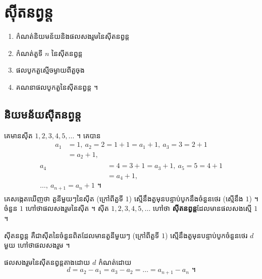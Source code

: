 \chapter{ស៊ីតនព្វន្ត}

\begin{objBox}[វត្ថុបំណង]
\begin{enumerate}[1]
  \item កំណត់និយមន័យនិងផលសងរួមនៃស៊ីតនព្វន្ត
  \item កំណត់តួទី $n$ នៃស៊ីតនព្វន្ត
  \item ផលបូកតួស្មើចម្ងាយពីតួចុង
  \item គណនាផលបូកតួនៃស៊ីតនព្វន្ត ។
\end{enumerate}
\end{objBox}

\section{និយមន័យស៊ីតនព្វន្ត}

\begin{example}[ឧទាហរណ៍]
គេមានស៊ីត $1, 2, 3, 4, 5, \ldots$ ។ គេបាន
\[
\begin{aligned}
a_1 &= 1,\ a_2 = 2 = 1 + 1 = a_1 + 1,\ a_3 = 3 = 2 + 1\\
&= a_2 + 1,
\end{aligned}
\]
\[
\begin{gathered}
\begin{aligned}
a_4 &= 4 = 3 + 1 = a_3 + 1,\ a_5 = 5 = 4 + 1\\
&= a_4 + 1,\\ \ldots,\ a_{n+1} = a_n + 1 \text{ ។}
\end{aligned}
\end{gathered}
\]
គេសង្កេតឃើញថា តួនីមួយៗនៃស៊ីត (ក្រៅពីតួទី $1$) ស្មើនឹងតួមុនបន្ទាប់បូកនឹងចំនួនថេរ (ស្មើនឹង $1$) ។ ចំនួន $1$ ហៅថាផលសងរួមនៃស៊ីត ។ ស៊ីត $1, 2, 3, 4, 5, \ldots$ ហៅថា \textbf{ស៊ីតនព្វន្ត}ដែលមានផលសងស្មើ $1$ ។
\end{example}

\begin{definition}
ស៊ីតនព្វន្ត គឺជាស៊ីតនៃចំនួនពិតដែលមានតួនីមួយៗ (ក្រៅពីតួទី $1$) ស្មើនឹងតួមុនបន្ទាប់បូកចំនួនថេរ $d$ មួយ ហៅថាផលសងរួម ។
\end{definition}

\begin{formulaBox}[ជាទូទៅ]
ផលសងរួមនៃស៊ីតនព្វន្តតាងដោយ $d$ កំណត់ដោយ
\[
d = a_2 - a_1 = a_3 - a_2 = \ldots = a_{n+1} - a_n \text{ ។}
\]
\end{formulaBox}

